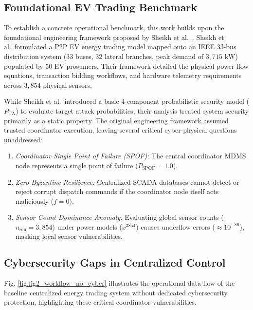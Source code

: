 \documentclass[10pt,twocolumn,journal]{IEEEtran}
\begin{document}
\subsection{Foundational EV Trading Benchmark}
To establish a concrete operational benchmark, this work builds upon the foundational engineering framework proposed by Sheikh et al.~\cite{sheikh2020}. Sheikh et al.\ formulated a P2P EV energy trading model mapped onto an IEEE 33-bus distribution system (33 buses, 32 lateral branches, peak demand of $3,715\text{ kW}$) populated by 50 EV prosumers. Their framework detailed the physical power flow equations, transaction bidding workflows, and hardware telemetry requirements across $3,854$ physical sensors. 

While Sheikh et al.\ introduced a basic 4-component probabilistic security model ($P_{\text{TA}}$) to evaluate target attack probabilities, their analysis treated system security primarily as a static property. The original engineering framework assumed trusted coordinator execution, leaving several critical cyber-physical questions unaddressed:
\begin{enumerate}[leftmargin=*]
    \item \emph{Coordinator Single Point of Failure (SPOF):} The central coordinator MDMS node represents a single point of failure ($P_{\text{SPOF}}=1.0$).
    \item \emph{Zero Byzantine Resilience:} Centralized SCADA databases cannot detect or reject corrupt dispatch commands if the coordinator node itself acts maliciously ($f=0$).
    \item \emph{Sensor Count Dominance Anomaly:} Evaluating global sensor counts ($n_{\text{sen}}=3,854$) under power models ($x^{3854}$) causes underflow errors ($\approx 10^{-86}$), masking local sensor vulnerabilities.
\end{enumerate}

\subsection{Cybersecurity Gaps in Centralized Control}
Fig. \ref{fig:fig2_workflow_no_cyber} illustrates the operational data flow of the baseline centralized energy trading system without dedicated cybersecurity protection, highlighting these critical coordinator vulnerabilities.
\end{document}
